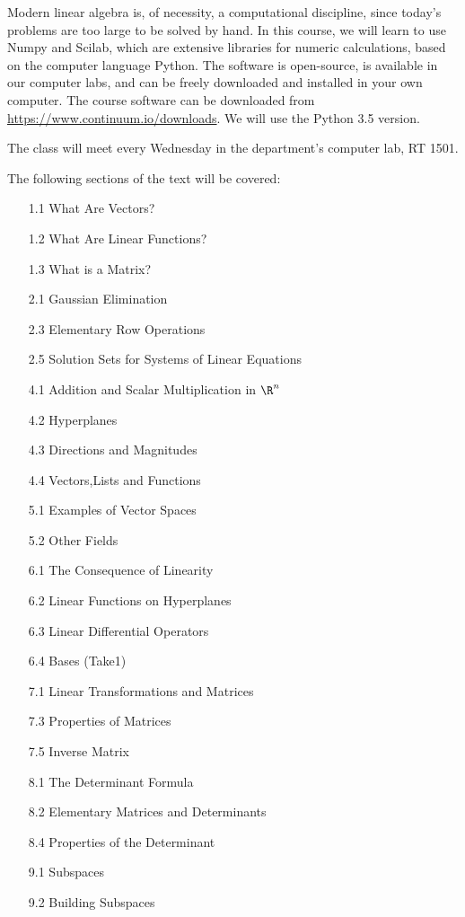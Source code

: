 \documentclass[11pt]{article}
\begin{document}
Modern linear algebra is, of necessity, a computational discipline, since today's problems are too large to be solved by hand. In this course, we will learn to use Numpy and Scilab, which are extensive libraries for numeric calculations, based on the computer language Python. The software is open-source, is available in our computer labs, and can be freely downloaded and installed in your own computer. The course software can be downloaded from \url{https://www.continuum.io/downloads}. We will use the Python 3.5 version.

The class will meet every Wednesday in the department's computer lab, RT 1501.

The following sections of the text will be covered:

\begin{itemize}
\item[1.1] What Are Vectors?
\item[1.2] What Are Linear Functions?
\item[1.3] What is a Matrix?
\item[2.1] Gaussian Elimination
\item[2.3] Elementary Row Operations
\item[2.5] Solution Sets for Systems of Linear Equations
\item[4.1] Addition and Scalar Multiplication in $\R^n$
\item[4.2] Hyperplanes
\item[4.3] Directions and Magnitudes
\item[4.4] Vectors,Lists and Functions
\item[5.1] Examples of Vector Spaces
\item[5.2] Other Fields
\item[6.1] The Consequence of Linearity
\item[6.2] Linear Functions on Hyperplanes
\item[6.3] Linear Differential Operators
\item[6.4] Bases (Take1)
\item[7.1] Linear Transformations and Matrices
\item[7.3] Properties of Matrices
\item[7.5] Inverse Matrix
\item[8.1] The Determinant Formula
\item[8.2] Elementary Matrices and Determinants
\item[8.4] Properties of the Determinant
\item[9.1] Subspaces
\item[9.2] Building Subspaces

\end{itemize}
\end{document}
